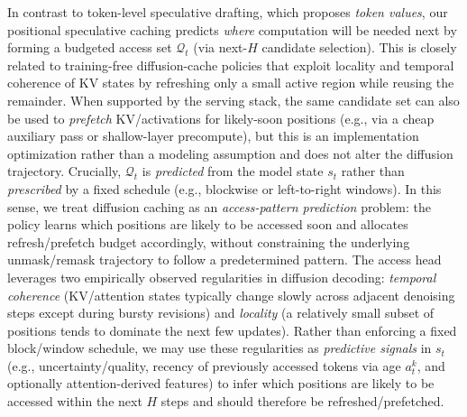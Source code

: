 \documentclass[11pt]{article}
\newcommand{\cQ}{\mathcal{Q}}
\begin{document}
In contrast to token-level speculative drafting, which proposes \emph{token values}, our positional
speculative caching predicts \emph{where} computation will be needed next by forming a budgeted access
set $\cQ_t$ (via next-$H$ candidate selection). This is closely related to training-free diffusion-cache
policies that exploit locality and temporal coherence of KV states by refreshing only a small active
region while reusing the remainder. When supported by the serving stack, the same candidate set
can also be used to \emph{prefetch} KV/activations for likely-soon positions (e.g., via a cheap auxiliary
pass or shallow-layer precompute), but this is an implementation optimization rather than a modeling
assumption and does not alter the diffusion trajectory.
Crucially, $\cQ_t$ is \emph{predicted} from the model state $s_t$ rather than
\emph{prescribed} by a fixed schedule (e.g., blockwise or left-to-right windows). In this sense, we treat
diffusion caching as an \emph{access-pattern prediction} problem: the policy learns which positions are
likely to be accessed soon and allocates refresh/prefetch budget accordingly, without constraining the
underlying unmask/remask trajectory to follow a predetermined pattern.
The access head leverages two empirically observed regularities in diffusion decoding: \emph{temporal coherence}
(KV/attention states typically change slowly across adjacent denoising steps except during bursty revisions)
and \emph{locality} (a relatively small subset of positions tends to dominate the next few updates).
Rather than enforcing a fixed block/window schedule, we may use these regularities as \emph{predictive signals} in $s_t$
(e.g., uncertainty/quality, recency of previously accessed tokens via age $a_t^k$, and optionally attention-derived features) to infer
which positions are likely to be accessed within the next $H$ steps and should therefore be refreshed/prefetched.
\end{document}
